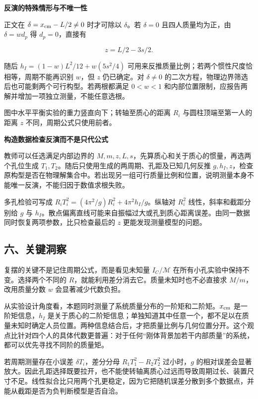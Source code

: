 \documentclass[12pt,a4paper,UTF8]{ctexart}
\begin{document}
\textbf{反演的特殊情形与不唯一性}

正文在 \(\delta=x_{\rm cm}-L/2\ne0\) 时才可除以 \(\delta\)。若
\(\delta=0\) 且四人质量均为正，由 \(\delta=wd_p\) 得 \(d_p=0\)，直接有

\[z=L/2-3s/2.\]

随后 \(h_I=(1-w)L^2/12+w(5s^2/4)\)
可用来反推质量比例；若两个惯性尺度恰相等，周期不能再识别 \(w\)，但 \(z\)
仍已确定。对 \(\delta\ne0\)
的二次方程，物理边界筛选后也可能剩两个可行构型。若两根都满足 \(0<w<1\)
和内部位置限制，应报告两解并增加一项独立测量，不能任意选根。

图中水平平衡实验的重力竖直向下；转轴至质心的距离 \(R_i\)
与圆柱顶端至第一人的距离 \(z\) 不同，周期公式只使用前者。

\textbf{构造数据检查反演而不是只代公式}

教师可以任选满足内部边界的
\(M,m,z,L,s\)，先算质心和关于质心的惯量，再选两个孔位生成
\(T_1,T_2\)。随后只使用生成的两周期、孔距及已知几何反推
\(g,h_I,z\)，检查原构型是否在物理解集合中。若出现另一组可行质量比例和位置，说明测量本身不能唯一反演，不能归因于数值求根失败。

多孔检验可写成 \(R_iT_i^2=(4\pi^2/g)R_i^2+4\pi^2h_I/g\)。纵轴对
\(R_i^2\) 线性，斜率和截距分别给 \(g\) 与
\(h_I\)。散点偏离直线可能来自振幅过大或孔到质心距离误差。由同一数据同时恢复两项参数，比只检查最后的
\(z\) 更能发现测量模型的问题。

\subsection{六、关键洞察}\label{ux516dux5173ux952eux6d1eux5bdf}

复摆的关键不是记住周期公式，而是看见未知量 \(I_C/\mathcal M\)
在所有小孔实验中保持不变。选择两个不同的
\(R\)，就能利用差分消去它。质量未知时也不必直接求 \(M/m\)，改用质量分数
\(w\) 会显著减少代数负担。

从实验设计角度看，本题同时测量了系统质量分布的一阶矩和二阶矩。\(x_{\rm cm}\)
是一阶矩信息，\(h_I\)
是关于质心的二阶矩信息；单独知道其中任意一个，都不足以在质量未知时确定人员位置。两种信息结合后，才把质量比例与几何位置分开。这个观点比针对四个人的具体代数更普遍：对于任何``刚体背景加若干内部质量''的系统，都可以优先寻找不同阶的质量矩。

若周期测量存在小误差 \(\delta T_i\)，差分分母 \(R_1T_1^2-R_2T_2^2\)
过小时，\(g\)
的相对误差会显著放大。因此孔距选择既要拉开，也不能使转轴离质心过远而导致周期过长、装置尺寸不足。线性拟合比只用两个孔更稳定，因为它把随机误差分散到多个数据点，并能从截距是否为负判断模型是否自洽。
\end{document}

